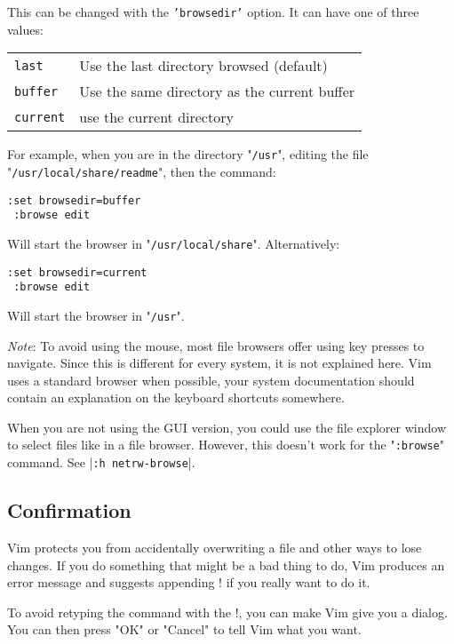 This can be changed with the \texttt{'browsedir'} option.  It can have one of three values:

\begin{center} \begin{tabular}{l l}
				\texttt{last} & Use the last directory browsed (default) \\
				\texttt{buffer} & Use the same directory as the current buffer \\
				\texttt{current} & use the current directory \\
\end{tabular} \end{center}

For example, when you are in the directory "\texttt{/usr}", editing the file "\texttt{/usr/local/share/readme}", then the command:

\begin{Verbatim}[samepage=true]
 :set browsedir=buffer
 :browse edit
\end{Verbatim}

Will start the browser in "\texttt{/usr/local/share}".
Alternatively:

\begin{Verbatim}[samepage=true]
 :set browsedir=current
 :browse edit
\end{Verbatim}

Will start the browser in "\texttt{/usr}".

\emph{Note}: To avoid using the mouse, most file browsers offer using key presses to navigate.
Since this is different for every system, it is not explained here.
Vim uses a standard browser when possible, your system documentation should contain an explanation on the keyboard shortcuts somewhere.

When you are not using the GUI version, you could use the file explorer window to select files like in a file browser.
However, this doesn't work for the "\texttt{:browse}" command.
See |\texttt{:h netrw-browse}|.
\subsection{Confirmation}
Vim protects you from accidentally overwriting a file and other ways to lose changes.
If you do something that might be a bad thing to do, Vim produces an error message and suggests appending ! if you really want to do it.

To avoid retyping the command with the !, you can make Vim give you a dialog.
You can then press "OK" or "Cancel" to tell Vim what you want.

